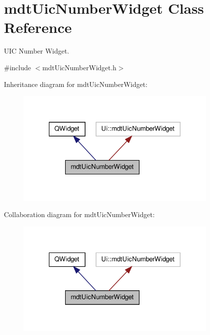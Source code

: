 \hypertarget{classmdt_uic_number_widget}{\section{mdt\-Uic\-Number\-Widget Class Reference}
\label{classmdt_uic_number_widget}
}


U\-I\-C Number Widget.  




{\ttfamily \#include $<$mdt\-Uic\-Number\-Widget.\-h$>$}



Inheritance diagram for mdt\-Uic\-Number\-Widget\-:
\nopagebreak
\begin{figure}[H]
\begin{center}
\leavevmode
\includegraphics[width=280pt]{classmdt_uic_number_widget__inherit__graph}
\end{center}
\end{figure}


Collaboration diagram for mdt\-Uic\-Number\-Widget\-:
\nopagebreak
\begin{figure}[H]
\begin{center}
\leavevmode
\includegraphics[width=280pt]{classmdt_uic_number_widget__coll__graph}
\end{center}
\end{figure}
